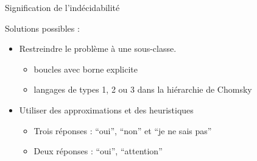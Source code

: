 \begin{frame}{Signification de l'indécidabilité}
\begin{center}
  \end{center}
  
  \begin{block}{Solutions possibles :}
    \begin{itemize}
    \item Restreindre le problème à une sous-classe.
      \begin{itemize}
      \item boucles  avec borne explicite
      \item langages de types 1, 2 ou 3 dans la hiérarchie de Chomsky
      \end{itemize}
    \item Utiliser des approximations et des heuristiques
      \begin{itemize}
      \item Trois réponses : ``oui'', ``non'' et ``je ne sais pas''
      \item Deux réponses : ``oui'', ``attention''
      \end{itemize}
    \end{itemize}
  \end{block}

\end{frame}

\endgroup
